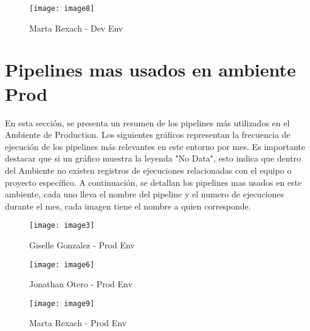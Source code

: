\documentclass{article}
\begin{document}
\begin{figure}[H]
    \centering
        \texttt{[image: image8]}
        \caption{Marta Rexach - Dev Env}
\end{figure}

\newpage

\section{Pipelines mas usados en ambiente Prod}

\vspace{0.5cm}

En esta sección, se presenta un resumen de los pipelines más utilizados en el Ambiente de Production. Los siguientes gráficos representan la frecuencia de ejecución de los pipelines más relevantes en este entorno por mes.
Es importante destacar que si un gráfico muestra la leyenda "No Data", esto indica que dentro del Ambiente no existen registros de ejecuciones relacionadas con el equipo o proyecto específico.
A continuación, se detallan los pipelines mas usados en este ambiente, cada uno lleva el nombre del pipeline y el numero de ejecuciones durante el mes, cada imagen tiene el nombre a quien corresponde.

\vspace{0.8cm}

\begin{figure}[H]
    \centering
        \texttt{[image: image3]}
        \caption{Giselle Gonzalez - Prod Env}
\end{figure}

    \vspace{0.8cm}
    
\begin{figure}[H]
    \centering
        \texttt{[image: image6]}
        \caption{Jonathan Otero - Prod Env}
\end{figure}

    \vspace{0.8cm}
    
\begin{figure}[H]
    \centering
        \texttt{[image: image9]}
        \caption{Marta Rexach - Prod Env}
\end{figure}

\vspace{0.5cm}
\end{document}
